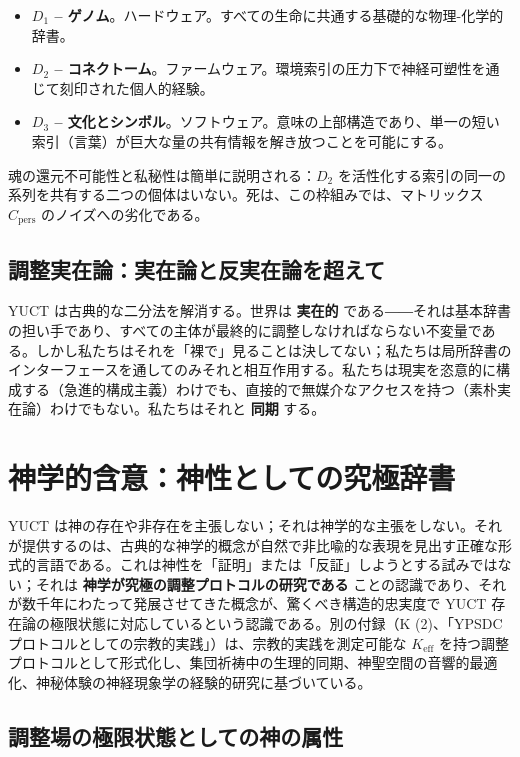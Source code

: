 \documentclass[12pt,a4paper]{article}
\begin{document}
	\begin{itemize}[leftmargin=*]
		\item \textbf{\(D_1\) – ゲノム}。ハードウェア。すべての生命に共通する基礎的な物理-化学的辞書。
		\item \textbf{\(D_2\) – コネクトーム}。ファームウェア。環境索引の圧力下で神経可塑性を通じて刻印された個人的経験。
		\item \textbf{\(D_3\) – 文化とシンボル}。ソフトウェア。意味の上部構造であり、単一の短い索引（言葉）が巨大な量の共有情報を解き放つことを可能にする。
	\end{itemize}
	
	魂の還元不可能性と私秘性は簡単に説明される：\(D_2\) を活性化する索引の同一の系列を共有する二つの個体はいない。死は、この枠組みでは、マトリックス \(C_{\mathrm{pers}}\) のノイズへの劣化である。
	
	\subsection{調整実在論：実在論と反実在論を超えて}
	
	YUCT は古典的な二分法を解消する。世界は \textbf{実在的} である――それは基本辞書の担い手であり、すべての主体が最終的に調整しなければならない不変量である。しかし私たちはそれを「裸で」見ることは決してない；私たちは局所辞書のインターフェースを通してのみそれと相互作用する。私たちは現実を恣意的に構成する（急進的構成主義）わけでも、直接的で無媒介なアクセスを持つ（素朴実在論）わけでもない。私たちはそれと \textbf{同期} する。
	
	\section{神学的含意：神性としての究極辞書}
	\label{sec:theology}
	
	YUCT は神の存在や非存在を主張しない；それは神学的な主張をしない。それが提供するのは、古典的な神学的概念が自然で非比喩的な表現を見出す正確な形式的言語である。これは神性を「証明」または「反証」しようとする試みではない；それは \textbf{神学が究極の調整プロトコルの研究である} ことの認識であり、それが数千年にわたって発展させてきた概念が、驚くべき構造的忠実度で YUCT 存在論の極限状態に対応しているという認識である。別の付録（K (2)、「YPSDC プロトコルとしての宗教的実践」）は、宗教的実践を測定可能な \(K_{\mathrm{eff}}\) を持つ調整プロトコルとして形式化し、集団祈祷中の生理的同期、神聖空間の音響的最適化、神秘体験の神経現象学の経験的研究に基づいている。
	
	\subsection{調整場の極限状態としての神の属性}
	
\end{document}
